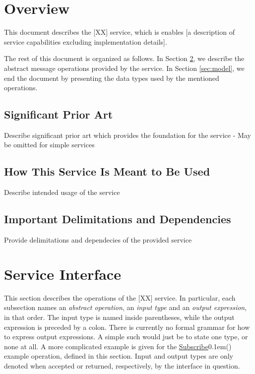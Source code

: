\documentclass[a4paper]{arrowhead}
\newcommand{\oref}[1]{{\textcolor{ArrowheadBlue}{\hyperref[sec:operations:#1]{#1}}{\kern 0.1em}()}}
\begin{document}
\section{Overview}
\label{sec:overview}
\color{red}
This document describes the [XX] service, which is enables [a description of service capabilities excluding implementation details]. 

The rest of this document is organized as follows.
In Section \ref{sec:operations}, we describe the abstract message operations provided by the service.
In Section \ref{sec:model}, we end the document by presenting the data types used by the mentioned operations.
\color{black}

\newpage

\subsection{Significant Prior Art}

\color{red} Describe significant prior art which provides the
foundation for the service - May be omitted for simple services \color{black}  

\subsection{How This Service Is Meant to Be Used}
\color{red} Describe intended usage of the service \color{black}  


\subsection{Important Delimitations and Dependencies}
\label{sec:delimitations}

\color{red} Provide delimitations and dependecies of the provided service \color{black}  



\newpage

\section{Service Interface}
\label{sec:operations}

\color{red}
This section describes the operations of the [XX] service.
In particular, each subsection names an {\em abstract operation}, an {\em input type} and an {\em output expression}, in that order.
The input type is named inside parentheses, while the output expression is preceded by a colon.
There is currently no formal grammar for how to express output expressions.
A simple such would just be to state one type, or none at all.
A more complicated example is given for the \oref{Subscribe} example operation, defined in this section.
Input and output types are only denoted when accepted or returned, respectively, by the interface in question.
\end{document}
